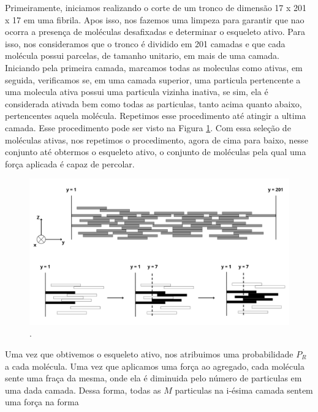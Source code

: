 \documentclass{article}
\begin{document}
        Primeiramente, iniciamos realizando o corte de um tronco de dimensão 17 x 201 x 17 em uma fibrila. Apos isso, nos fazemos uma limpeza 
        para garantir que nao ocorra a presença de moléculas desafixadas e determinar o esqueleto ativo. Para isso, nos consideramos que o 
        tronco é dividido em 201 camadas e que cada molécula possui parcelas, de tamanho unitario, em mais de uma camada. Iniciando pela primeira 
        camada, marcamos todas as moleculas como ativas, em seguida, verificamos se, em uma camada superior, uma particula pertencente a uma molecula 
        ativa possui uma particula vizinha inativa, se sim, ela é considerada ativada bem como todas as particulas, tanto acima quanto abaixo, pertencentes 
        aquela molécula. Repetimos esse procedimento até atingir a ultima camada. Esse procedimento pode ser visto na Figura \ref{M3}. Com essa 
        seleção de moléculas ativas, nos repetimos o procedimento, agora de cima para baixo, nesse conjunto até obtermos o esqueleto ativo, o conjunto 
        de moléculas pela qual uma força aplicada é capaz de percolar. 

        \begin{figure}[H]
            \centering
            \includegraphics[width=\textwidth]{figures/esqueleto.png}
    
            \caption{.} 
    
            \label{M3}
        \end{figure}

        Uma vez que obtivemos o esqueleto ativo, nos atribuimos uma probabilidade $P_{R}$ a cada molécula. Uma vez que aplicamos uma força ao agregado,
        cada molécula sente uma fraça da mesma, onde ela é diminuida pelo número de particulas em uma dada camada. Dessa forma, todas as $M$ particulas 
        na i-ésima camada sentem uma força na forma 
\end{document}
